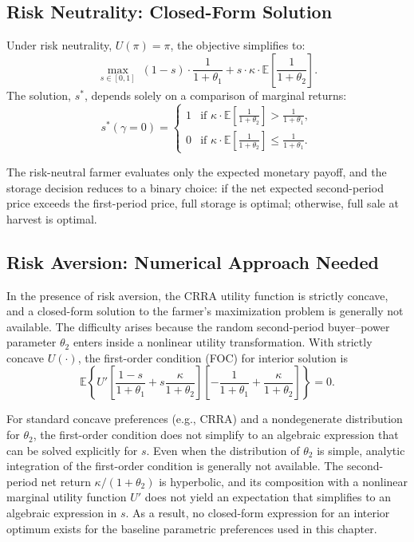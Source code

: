 \subsection{Risk Neutrality: Closed-Form Solution}
\noindent Under risk neutrality, $U(\pi) = \pi$, the objective simplifies to:
\begin{equation}
\max_{s \in [0,1]} \; 
(1 - s) \cdot \frac{1}{1 + \theta_1} 
+ 
s \cdot \kappa \cdot \mathbb{E} \left[ \frac{1}{1 + \theta_2} \right].
\end{equation}
The solution, $s^*$, depends solely on a comparison of marginal returns:
\begin{equation}
s^*( \gamma = 0) =
\begin{cases}
1 & \text{if } \kappa \cdot \mathbb{E} \left[ \frac{1}{1 + \theta_2} \right] > \frac{1}{1 + \theta_1}, \\
0 & \text{if } \kappa \cdot \mathbb{E} \left[ \frac{1}{1 + \theta_2} \right] \leq \frac{1}{1 + \theta_1}.
\end{cases}
\label{Eq: risk-neutrality solution}
\end{equation}

\noindent The risk-neutral farmer evaluates only the expected monetary payoff, and the storage decision reduces to a binary choice: if the net expected second-period price exceeds the first-period price, full storage is optimal; otherwise, full sale at harvest is optimal.


\subsection{Risk Aversion: Numerical Approach Needed}
\noindent In the presence of risk aversion, the CRRA utility function is strictly concave, and a closed-form solution to the farmer's maximization problem is generally not available. The difficulty arises because the random second-period buyer–power parameter $\theta_2$ enters inside a nonlinear utility transformation. With strictly concave $U(\cdot)$, the first-order condition (FOC) for interior solution is
\begin{equation}
    \mathbb{E}\!\left\{
U'\!\left[\frac{1-s}{1+\theta_1}
+ s\frac{\kappa}{1+\theta_2}\right]
\left[-\frac{1}{1+\theta_1}+\frac{\kappa}{1+\theta_2}\right]
\right\}=0.
\label{Eq: Optimization FOC}
\end{equation}

For standard concave preferences (e.g., CRRA) and a nondegenerate distribution for $\theta_2$, the first-order condition does not simplify to an algebraic expression that can be solved explicitly for $s$. Even when the distribution of $\theta_2$ is simple, analytic integration of the first-order condition is generally not available. The second-period net return $\kappa/(1+\theta_2)$ is hyperbolic, and its composition with a nonlinear marginal utility function $U'$ does not yield an expectation that simplifies to an algebraic expression in $s$. As a result, no closed-form expression for an interior optimum exists for the baseline parametric preferences used in this chapter.

